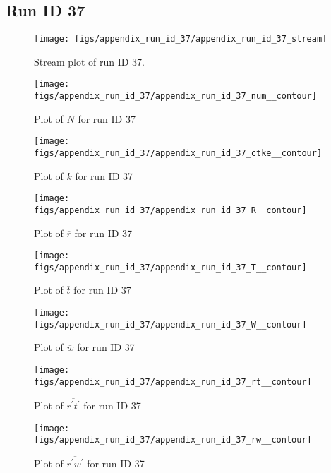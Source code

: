 \subsection{Run ID 37}
\begin{figure}[H]
\centering
\texttt{[image: figs/appendix\_run\_id\_37/appendix\_run\_id\_37\_stream]}
\caption{Stream plot of run ID 37.}
\label{fig:appendix_run_id_37_stream}
\end{figure}


\begin{figure}[H]
\centering
\texttt{[image: figs/appendix\_run\_id\_37/appendix\_run\_id\_37\_num\_\_contour]}
\caption{Plot of $N$ for run ID 37}
\label{fig:appendix_run_id_37_num__contour}
\end{figure}


\begin{figure}[H]
\centering
\texttt{[image: figs/appendix\_run\_id\_37/appendix\_run\_id\_37\_ctke\_\_contour]}
\caption{Plot of $k$ for run ID 37}
\label{fig:appendix_run_id_37_ctke__contour}
\end{figure}


\begin{figure}[H]
\centering
\texttt{[image: figs/appendix\_run\_id\_37/appendix\_run\_id\_37\_R\_\_contour]}
\caption{Plot of $\overline{r}$ for run ID 37}
\label{fig:appendix_run_id_37_R__contour}
\end{figure}


\begin{figure}[H]
\centering
\texttt{[image: figs/appendix\_run\_id\_37/appendix\_run\_id\_37\_T\_\_contour]}
\caption{Plot of $\overline{t}$ for run ID 37}
\label{fig:appendix_run_id_37_T__contour}
\end{figure}


\begin{figure}[H]
\centering
\texttt{[image: figs/appendix\_run\_id\_37/appendix\_run\_id\_37\_W\_\_contour]}
\caption{Plot of $\overline{w}$ for run ID 37}
\label{fig:appendix_run_id_37_W__contour}
\end{figure}


\begin{figure}[H]
\centering
\texttt{[image: figs/appendix\_run\_id\_37/appendix\_run\_id\_37\_rt\_\_contour]}
\caption{Plot of $\overline{r^\prime t^\prime}$ for run ID 37}
\label{fig:appendix_run_id_37_rt__contour}
\end{figure}


\begin{figure}[H]
\centering
\texttt{[image: figs/appendix\_run\_id\_37/appendix\_run\_id\_37\_rw\_\_contour]}
\caption{Plot of $\overline{r^\prime w^\prime}$ for run ID 37}
\label{fig:appendix_run_id_37_rw__contour}
\end{figure}


